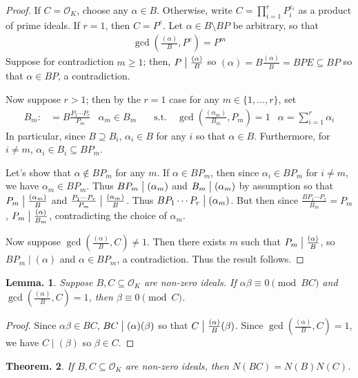 \documentclass[11pt, a4paper]{memoir}
\renewcommand{\div}{\bigm|}
\theoremstyle{change}
\newtheorem{theorem}{Theorem.}[section]
\newtheorem{lemma}[theorem]{Lemma.}
\theoremstyle{plain}
\theoremstyle{nonumberplain}
\newtheorem{proof}{Proof}
\numberwithin{equation}{section}
\begin{document}
\begin{proof}
    If $C=\mathcal{O}_K$, choose any $\alpha\in B$.
    Otherwise, write $C=\prod_{i=1}^r P_i^{e_i}$ as a product of prime ideals.
    If $r=1$, then $C=P^e$.
    Let $\alpha\in B\setminus BP$ be arbitrary, so that
    \begin{align*}
        \gcd\left(\frac{(\alpha)}{B},P^e\right)=P^m
    \end{align*}
    Suppose for contradiction $m\geq 1$; then, $P\div\frac{(\alpha)}{B}$ so $(\alpha)=B\frac{(\alpha)}{B}=BP E\subseteq BP$ so that $\alpha\in BP$, a contradiction.

    Now suppose $r>1$; then by the $r=1$ case for any $m\in\{1,\ldots,r\}$, set
    \begin{align*}
        B_m:&=B\frac{P_1\cdots P_r}{P_m} & \alpha_m \in B_m &\quad\text{s.t.}\quad\gcd\left(\frac{(\alpha_m)}{B_m},P_m\right)=1 & \alpha=\sum_{i=1}^r\alpha_i
    \end{align*}
    In particular, since $B\supseteq B_i$, $\alpha_i\in B$ for any $i$ so that $\alpha\in B$.
    Furthermore, for $i\neq m$, $\alpha_i\in B_i\subseteq BP_m$.

    Let's show that $\alpha\notin BP_m$ for any $m$.
    If $\alpha\in BP_m$, then since $\alpha_i\in BP_m$ for $i\neq m$, we have $\alpha_m\in BP_m$.
    Thus $BP_m\div(\alpha_m)$ and $B_m\div(\alpha_m)$ by assumption so that $P_m\div\frac{(\alpha_m)}{B}$ and $\frac{P_1\cdots P_r}{P_m}\div\frac{(\alpha_m)}{B}$.
    Thus $BP_1\cdots P_r\div(\alpha_m)$.
    But then since $\frac{BP_1\cdots P_r}{B_m}=P_m$, $P_m\div\frac{(\alpha)}{B_m}$, contradicting the choice of $\alpha_m$.

    Now suppose $\gcd\left(\frac{(\alpha)}{B},C\right)\neq 1$.
    Then there exists $m$ such that $P_m\div\frac{(\alpha)}{B}$, so $BP_m\mid(\alpha)$ and $\alpha\in BP_m$, a contradiction.
    Thus the result follows.
\end{proof}
\begin{lemma}\label{lem:gcd-cp}
    Suppose $B,C\subseteq\mathcal{O}_K$ are non-zero ideals.
    If $\alpha\beta\equiv 0\pmod{BC}$ and $\gcd\left(\frac{(\alpha)}{B},C\right)=1$, then $\beta\equiv 0\pmod{C}$.
\end{lemma}
\begin{proof}
    Since $\alpha\beta\in BC$, $BC\div(\alpha)(\beta)$ so that $C\div\frac{(\alpha)}{B}(\beta)$.
    Since $\gcd\left(\frac{(\alpha)}{B},C\right)=1$, we have $C\mid(\beta)$ so $\beta\in C$.
\end{proof}
\begin{theorem}
    If $B,C\subseteq\mathcal{O}_K$ are non-zero ideals, then $N(BC)=N(B)N(C)$.
\end{theorem}
\end{document}

